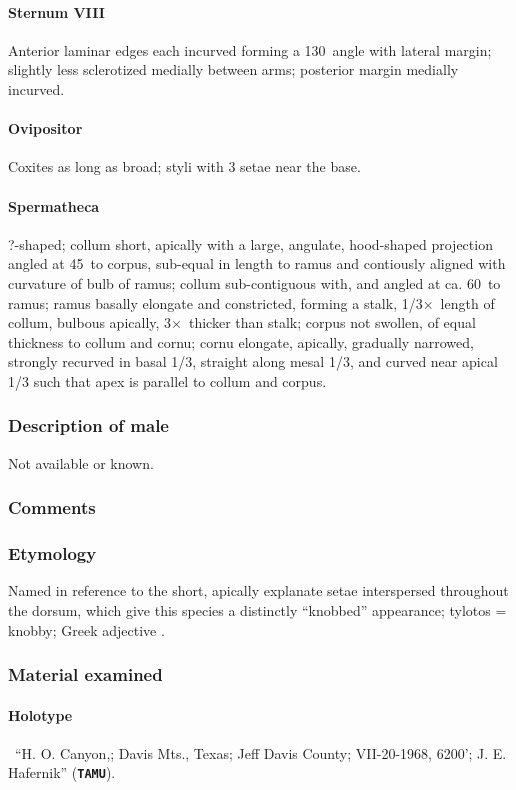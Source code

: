 \documentclass[fleqn,10pt,lineno]{wlpeerj} %
\newcommand{\td}{\textdegree~}
\newcommand{\x}{$\times$~}
\begin{document}
			\paragraph{Sternum VIII}
				Anterior laminar edges each incurved forming a 130\td angle with lateral margin; slightly less sclerotized medially between arms; posterior margin medially incurved.
			\paragraph{Ovipositor}
				Coxites as long as broad; styli with 3 setae near the base.
			\paragraph{Spermatheca}
				?-shaped; collum short, apically with a large, angulate, hood-shaped projection angled at 45\td to corpus, sub-equal in length to ramus and contiously aligned with curvature of bulb of ramus; collum sub-contiguous with, and angled at ca. 60\td to ramus; ramus basally elongate and constricted, forming a stalk, 1/3\x length of collum, bulbous apically, 3\x thicker than stalk; corpus not swollen, of equal thickness to collum and cornu; cornu elongate, apically, gradually narrowed, strongly recurved in basal 1/3, straight along mesal 1/3, and curved near apical 1/3 such that apex is parallel to collum and corpus.
		\subsubsection*{Description of male}
			Not available or known.
		\subsubsection*{Comments}
		\subsubsection*{Etymology}
			Named in reference to the short, apically explanate setae interspersed throughout the dorsum, which give this species a distinctly ``knobbed'' appearance; tylotos = knobby; Greek adjective \citep{brown1956}.
		\subsubsection*{Material examined}
			\paragraph{Holotype}
				\female~``H. O. Canyon,; Davis Mts., Texas; Jeff Davis County; VII-20-1968, 6200'; J. E. Hafernik'' (\texttt{\textbf{TAMU}}).
\end{document}
